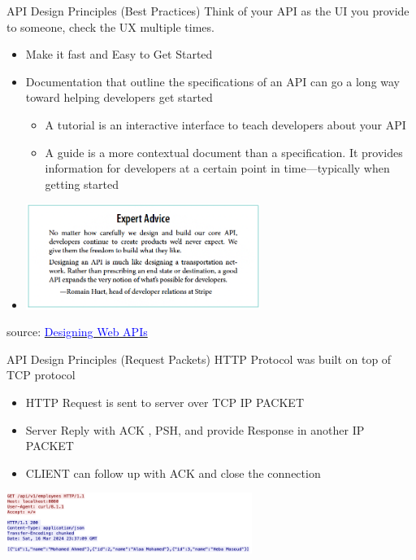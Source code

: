 \documentclass{beamer}
\begin{document}
\begin{frame}{API Design Principles (Best Practices)}
	\scriptsize
	Think of your API as the UI you provide to someone, check the UX multiple times. 
  \begin{itemize}
    \item<2-> Make it fast and Easy to Get Started
    \item<3-> Documentation that outline the specifications of an API can go a long way toward helping developers get started
    	\begin{itemize}
    		\scriptsize
		    \item<4-> A tutorial is an interactive interface to teach developers about your API
		    \item<5-> A guide is a more contextual document than a specification. It provides information for developers at a certain point in time—typically when getting started
	    \end{itemize}
    \item<6->[]
    	\begin{center}
   			\includegraphics[width=0.6\textwidth, height=0.3\textheight]{img/advice-api-2.png}
	    \end{center}
  \end{itemize}
    
  \tiny { source: \href{https://www.oreilly.com/library/view/designing-web-apis/9781492026914/}{\textcolor{blue}{Designing Web APIs}}}
\end{frame}

\begin{frame}{API Design Principles (Request Packets)}
	\scriptsize
	HTTP Protocol was built on top of TCP protocol
	\begin{itemize}
    \item HTTP Request is sent to server over TCP IP PACKET
    \item Server Reply with ACK , PSH, and provide Response in another IP PACKET
    \item CLIENT can follow up with ACK and close the connection
  \end{itemize}
  
   	\begin{center}
   		\includegraphics[width=0.6\textwidth, height=0.4\textheight]{img/api-request-details.png}
	\end{center}
    
\end{frame}
\end{document}
